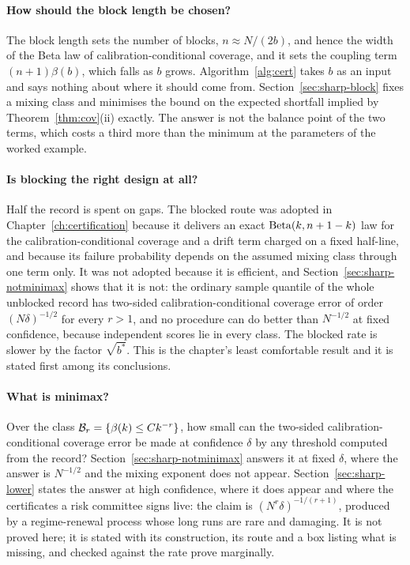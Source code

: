 \documentclass[../../../main.tex]{subfiles}
\begin{document}
\paragraph{How should the block length be chosen?} The block length sets the number of blocks, $n\approx N/(2b)$, and hence the width of the Beta law of calibration-conditional coverage, and it sets the coupling term $(n+1)\beta(b)$, which falls as $b$ grows. Algorithm~\ref{alg:cert} takes $b$ as an input and says nothing about where it should come from. Section~\ref{sec:sharp-block} fixes a mixing class and minimises the bound on the expected shortfall implied by Theorem~\ref{thm:cov}(ii) exactly. The answer is not the balance point of the two terms, which costs a third more than the minimum at the parameters of the worked example.

\paragraph{Is blocking the right design at all?} Half the record is spent on gaps. The blocked route was adopted in Chapter~\ref{ch:certification} because it delivers an exact $\operatorname{Beta}(k,n+1-k)$ law for the calibration-conditional coverage and a drift term charged on a fixed half-line, and because its failure probability depends on the assumed mixing class through one term only. It was not adopted because it is efficient, and Section~\ref{sec:sharp-notminimax} shows that it is not: the ordinary sample quantile of the whole unblocked record has two-sided calibration-conditional coverage error of order $(N\delta)^{-1/2}$ for every $r>1$, and no procedure can do better than $N^{-1/2}$ at fixed confidence, because independent scores lie in every class. The blocked rate is slower by the factor $\sqrt{b^*}$. This is the chapter's least comfortable result and it is stated first among its conclusions.

\paragraph{What is minimax?} Over the class $\mathcal B_{r}=\{\beta(k)\le Ck^{-r}\}$, how small can the two-sided calibration-conditional coverage error be made at confidence $\delta$ by any threshold computed from the record? Section~\ref{sec:sharp-notminimax} answers it at fixed $\delta$, where the answer is $N^{-1/2}$ and the mixing exponent does not appear. Section~\ref{sec:sharp-lower} states the answer at high confidence, where it does appear and where the certificates a risk committee signs live: the claim is $(N^r\delta)^{-1/(r+1)}$, produced by a regime-renewal process whose long runs are rare and damaging. It is not proved here; it is stated with its construction, its route and a box listing what is missing, and checked against the rate \citet[Cor.~2]{barber2026} prove marginally.
\end{document}

